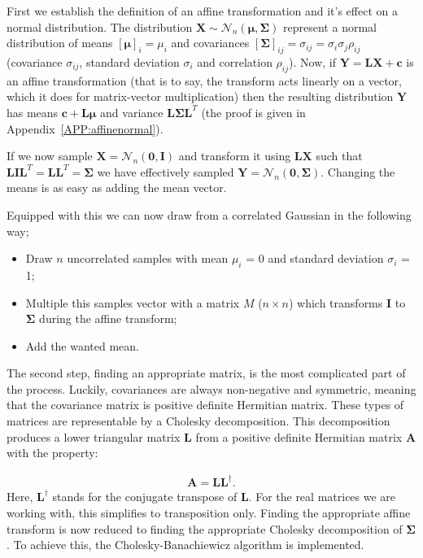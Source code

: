 First we establish the definition of an affine transformation and it's effect on a normal distribution. The distribution $\mathbf{X} \sim \mathcal{N}_n \left( \bm{\mu}, \bm{\Sigma} \right)$ represent a normal distribution of means $\left[\bm{\mu}\right]_i = \mu_i$ and covariances $\left[ \bm{\Sigma} \right]_{ij} = \sigma_{ij} = \sigma_i \sigma_j \rho_{ij}$ (covariance $\sigma_{ij}$, standard deviation $\sigma_i$ and correlation $\rho_{ij}$). Now, if $\mathbf{Y} = \bm{L} \mathbf{X} + \bm{c}$ is an affine transformation (that is to say, the transform acts linearly on a vector, which it does for matrix-vector multiplication) then the resulting distribution $\mathbf{Y}$ has means $\bm{c} + \bm{L}\bm{\mu}$ and variance $\bm{L} \bm{\Sigma} \bm{L}^T$ (the proof is given in Appendix~\ref{APP:affinenormal}).

If we now sample $\mathbf{X} = \mathcal{N}_n \left( \mathbf{0},\mathbf{I} \right)$ and transform it using $\bm{L}\mathbf{X}$ such that $\bm{L}\bm{I}\bm{L}^T = \bm{L}\bm{L}^T = \bm{\Sigma}$ we have effectively sampled $\mathbf{Y} = \mathcal{N}_n \left( \mathbf{0},\mathbf{\Sigma} \right)$. Changing the means is as easy as adding the mean vector.

Equipped with this we can now draw from a correlated Gaussian in the following way;
\begin{itemize}
	\item Draw $n$ uncorrelated samples with mean $\mu_i$ = 0 and standard deviation $\sigma_i$ = 1;
	\item Multiple this samples vector with a matrix $M$ ($n \times n$) which transforms $\mathbf{I}$ to $\mathbf{\Sigma}$ during the affine transform;
	\item Add the wanted mean.
\end{itemize}

The second step, finding an appropriate matrix, is the most complicated part of the process. Luckily, covariances are always non-negative and symmetric, meaning that the covariance matrix is positive definite Hermitian matrix. These types of matrices are representable by a Cholesky decomposition. This decomposition produces a lower triangular matrix $\mathbf{L}$ from a positive definite Hermitian matrix $\mathbf{A}$ with the property:

\begin{align}
	\mathbf{A} = \mathbf{L} \mathbf{L}^\dagger.
\end{align}
Here, $\mathbf{L}^\dagger$ stands for the conjugate transpose of $\mathbf{L}$. For the real matrices we are working with, this simplifies to transposition only. Finding the appropriate affine transform is now reduced to finding the appropriate Cholesky decomposition of $\mathbf{\Sigma}$. To achieve this, the Cholesky-Banachiewicz algorithm is implemented.

